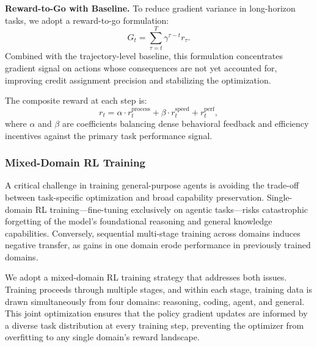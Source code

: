 \noindent \textbf{Reward-to-Go with Baseline.} To reduce gradient variance in long-horizon tasks, we adopt a reward-to-go formulation:
\begin{equation}
G_t = \sum_{\tau=t}^{T} \gamma^{\tau-t} r_\tau.
\end{equation}
Combined with the trajectory-level baseline, this formulation concentrates gradient signal on actions whose consequences are not yet accounted for, improving credit assignment precision and stabilizing the optimization.

The composite reward at each step is:
\begin{equation}
r_t = \alpha \cdot r_t^{\text{process}} + \beta \cdot r_t^{\text{speed}} + r_t^{\text{perf}},
\end{equation}
where $\alpha$ and $\beta$ are coefficients balancing dense behavioral feedback and efficiency incentives against the primary task performance signal.

\subsubsection{Mixed-Domain RL Training}

A critical challenge in training general-purpose agents is avoiding the trade-off between task-specific optimization and broad capability preservation. Single-domain RL training---fine-tuning exclusively on agentic tasks---risks catastrophic forgetting of the model's foundational reasoning and general knowledge capabilities. Conversely, sequential multi-stage training across domains induces negative transfer, as gains in one domain erode performance in previously trained domains.

We adopt a mixed-domain RL training strategy that addresses both issues. Training proceeds through multiple stages, and within each stage, training data is drawn simultaneously from four domains: reasoning, coding, agent, and general. This joint optimization ensures that the policy gradient updates are informed by a diverse task distribution at every training step, preventing the optimizer from overfitting to any single domain's reward landscape.

